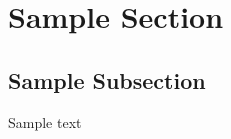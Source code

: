 \documentclass{article}
\begin{document}
\section{Sample Section}
\subsection{Sample Subsection}
Sample text
\end{document}
